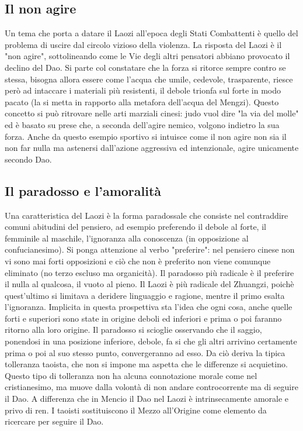 \documentclass[10pt,a4paper]{report}
\begin{document}
\subsection{Il non agire}
Un tema che porta a datare il Laozi all'epoca degli Stati Combattenti è quello del problema di uscire dal circolo vizioso della violenza. La risposta del Laozi è il "non agire", sottolineando come le Vie degli altri pensatori abbiano provocato il declino del Dao. Si parte col constatare che la forza si ritorce sempre contro se stessa, bisogna allora essere come l'acqua che umile, cedevole, trasparente, riesce però ad intaccare i materiali più resistenti, il debole trionfa sul forte in modo pacato (la si metta in rapporto alla metafora dell'acqua del Mengzi). Questo concetto si può ritrovare nelle arti marziali cinesi: judo vuol dire "la via del molle" ed è basato su prese che, a seconda dell'agire nemico, volgono indietro la sua forza. Anche da questo esempio sportivo si intuisce come il non agire non sia il non far nulla ma astenersi dall'azione aggressiva ed intenzionale, agire unicamente secondo Dao.
\subsection{Il paradosso e l'amoralità}
Una caratteristica del Laozi è la forma paradossale che consiste nel contraddire comuni abitudini del pensiero, ad esempio preferendo il debole al forte, il femminile al maschile, l'ignoranza alla conoscenza (in opposizione al confucianesimo). Si ponga attenzione al verbo "preferire": nel pensiero cinese non vi sono mai forti opposizioni e ciò che non è preferito non viene comunque eliminato (no terzo escluso ma organicità). Il paradosso più radicale è il preferire il nulla al qualcosa, il vuoto al pieno. Il Laozi è più radicale del Zhuangzi, poichè quest'ultimo si limitava a deridere linguaggio e ragione, mentre il primo esalta l'ignoranza. Implicita in questa prospettiva sta l'idea che ogni cosa, anche quelle forti e superiori sono state in origine deboli ed inferiori e prima o poi faranno ritorno alla loro origine. Il paradosso si scioglie osservando che il saggio, ponendosi in una posizione inferiore, debole, fa si che gli altri arrivino certamente prima o poi al suo stesso punto, convergeranno ad esso. Da ciò deriva la tipica tolleranza taoista, che non si impone ma aspetta che le differenze si acquietino. Questo tipo di tolleranza non ha alcuna connotazione morale come nel cristianesimo, ma muove dalla volontà di non andare controcorrente ma di seguire il Dao. A differenza che in Mencio il Dao nel Laozi è intrinsecamente amorale e privo di ren. I taoisti sostituiscono il Mezzo all'Origine come elemento da ricercare per seguire il Dao. 
\end{document}
